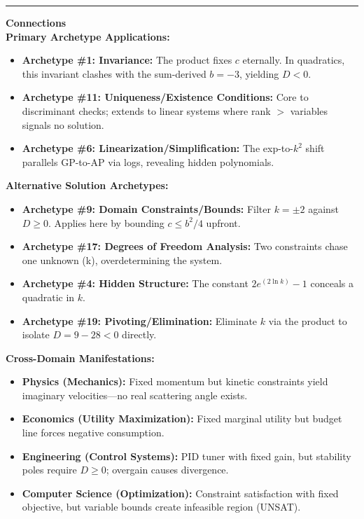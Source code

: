 \documentclass{article}
\begin{document}
\noindent \rule{\textwidth}{0.4pt}

\noindent \textbf{Connections} \\

\noindent \textbf{Primary Archetype Applications:}
\begin{itemize}
    \item \textbf{Archetype \#1: Invariance:} The product fixes $c$ eternally. In quadratics, this invariant clashes with the sum-derived $b=-3$, yielding $D<0$.
    \item \textbf{Archetype \#11: Uniqueness/Existence Conditions:} Core to discriminant checks; extends to linear systems where rank $>$ variables signals no solution.
    \item \textbf{Archetype \#6: Linearization/Simplification:} The exp-to-$k^2$ shift parallels GP-to-AP via logs, revealing hidden polynomials.
\end{itemize}

\noindent \textbf{Alternative Solution Archetypes:}
\begin{itemize}
    \item \textbf{Archetype \#9: Domain Constraints/Bounds:} Filter $k=\pm 2$ against $D \ge 0$. Applies here by bounding $c \le b^2/4$ upfront.
    \item \textbf{Archetype \#17: Degrees of Freedom Analysis:} Two constraints chase one unknown (k), overdetermining the system.
    \item \textbf{Archetype \#4: Hidden Structure:} The constant $2e^{(2 \ln k)}-1$ conceals a quadratic in $k$.
    \item \textbf{Archetype \#19: Pivoting/Elimination:} Eliminate $k$ via the product to isolate $D=9-28<0$ directly.
\end{itemize}

\noindent \textbf{Cross-Domain Manifestations:}
\begin{itemize}
    \item \textbf{Physics (Mechanics):} Fixed momentum but kinetic constraints yield imaginary velocities—no real scattering angle exists.
    \item \textbf{Economics (Utility Maximization):} Fixed marginal utility but budget line forces negative consumption.
    \item \textbf{Engineering (Control Systems):} PID tuner with fixed gain, but stability poles require $D \ge 0$; overgain causes divergence.
    \item \textbf{Computer Science (Optimization):} Constraint satisfaction with fixed objective, but variable bounds create infeasible region (UNSAT).
\end{itemize}
\end{document}
